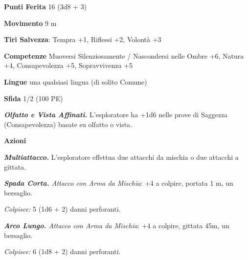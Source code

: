 \begin{multicols}{2}
\textbf{Punti Ferita} 16 (3d8 + 3)

\textbf{Movimento} 9 m

\textbf{Tiri Salvezza}: Tempra +1, Riflessi +2, Volontà +3

\textbf{Competenze} Muoversi Silenziosamente / Nascondersi nelle Ombre +6, Natura +4, Consapevolezza +5, Sopravvivenza +5

\textbf{Lingue} una qualsiasi lingua (di solito Comune)

\textbf{Sfida} 1/2 (100 PE)

\emph{\textbf{Olfatto e Vista Affinati.}} L'esploratore ha +1d6 nelle prove di Saggezza (Consapevolezza) basate su olfatto o vista.

\textbf{Azioni}

\emph{\textbf{Multiattacco.}} L'esploratore effettua due attacchi da mischia o due attacchi a gittata.

\emph{\textbf{Spada Corta.} Attacco con Arma da Mischia}: +4 a colpire, portata 1 m, un bersaglio.

\emph{Colpisce:} 5 (1d6 + 2) danni perforanti.

\emph{\textbf{Arco Lungo.} Attacco con Arma da Mischia}: +4 a colpire, gittata 45m, un bersaglio.

\emph{Colpisce:} 6 (1d8 + 2) danni perforanti.


\end{multicols}

%